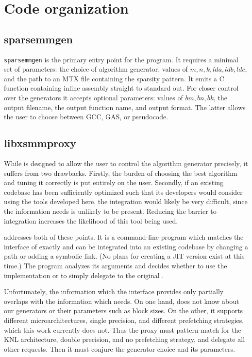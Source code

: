 \section{Code organization}




\subsection{sparsemmgen}

\texttt{sparsemmgen} is the primary entry point for the program. It requires a minimal set of parameters: the choice of algorithm generator, values of $m, n, k, lda, ldb, ldc,$ and the path to an MTX file containing the sparsity pattern. It emits a C function containing inline assembly straight to standard out. For closer control over the generators it accepts optional parameters: values of $bm, bn, bk$, the output filename, the output function name, and output format. The latter allows the user to choose between GCC, GAS, or pseudocode. 



\subsection{libxsmmproxy}

While  is designed to allow the user to control the algorithm generator precisely, it suffers from two drawbacks. Firstly, the burden of choosing the best algorithm and tuning it correctly is put entirely on the user. Secondly, if an existing codebase has been sufficiently optimized such that its developers would consider using the tools developed here, the integration would likely be very difficult, since the information  needs is unlikely to be present. Reducing the barrier to integration increases the likelihood of this tool being used.

 addresses both of these points. It is a command-line program which matches the interface of  exactly and can be integrated into an existing codebase by changing a path or adding a symbolic link. (No plans for creating a JIT version exist at this time.) The program analyzes its arguments and decides whether to use the  implementation or to simply delegate to the original .

Unfortunately, the information which the  interface provides only partially overlaps with the information which  needs. On one hand,  does not know about our generators or their parameters such as block sizes. On the other, it supports different microarchitectures, single precision, and different prefetching strategies, which this work currently does not. Thus the proxy must pattern-match for the KNL architecture, double precision, and no prefetching strategy, and delegate all other requests. Then it must conjure the generator choice and its parameters.

